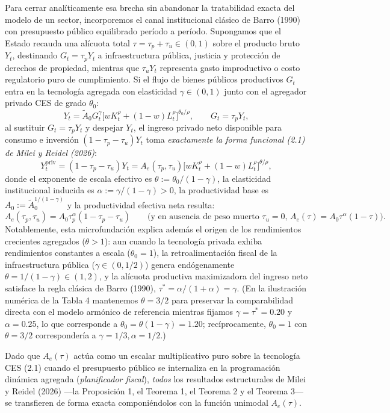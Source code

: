 \documentclass[11pt,letterpaper]{article}
\theoremstyle{plain}
\begin{document}
Para cerrar analíticamente esa brecha sin abandonar la tratabilidad exacta del modelo de un sector, incorporemos el canal institucional clásico de Barro (1990) con presupuesto público equilibrado período a período. Supongamos que el Estado recauda una alícuota total $\tau=\tau_p+\tau_u\in(0,1)$ sobre el producto bruto $Y_t$, destinando $G_t=\tau_p Y_t$ a infraestructura pública, justicia y protección de derechos de propiedad, mientras que $\tau_u Y_t$ representa gasto improductivo o costo regulatorio puro de cumplimiento. Si el flujo de bienes públicos productivos $G_t$ entra en la tecnología agregada con elasticidad $\gamma\in(0,1)$ junto con el agregador privado CES de grado $\theta_0$:
\[
Y_t = \widetilde{A}_0 G_t^\gamma \big[wK_t^\rho + (1-w)L_t^\rho\big]^{\theta_0/\rho}, \qquad G_t = \tau_p Y_t,
\]
al sustituir $G_t=\tau_p Y_t$ y despejar $Y_t$, el ingreso privado neto disponible para consumo e inversión $(1-\tau_p-\tau_u)Y_t$ toma \emph{exactamente la forma funcional (2.1) de Milei y Reidel (2026)}:
\[
Y_t^{\mathrm{priv}} = (1-\tau_p-\tau_u)Y_t = A_e(\tau_p,\tau_u)\big[wK_t^\rho + (1-w)L_t^\rho\big]^{\theta/\rho},
\]
donde el exponente de escala efectivo es $\theta:=\theta_0/(1-\gamma)$, la elasticidad institucional inducida es $\alpha:=\gamma/(1-\gamma)>0$, la productividad base es $A_0:=\widetilde{A}_0^{1/(1-\gamma)}$ y la productividad efectiva neta resulta:
\[
A_e(\tau_p,\tau_u) = A_0\tau_p^\alpha(1-\tau_p-\tau_u) \qquad \text{(y en ausencia de peso muerto $\tau_u=0$, } A_e(\tau)=A_0\tau^\alpha(1-\tau)\text{).}
\]
Notablemente, esta microfundación explica además el origen de los rendimientos crecientes agregados ($\theta>1$): aun cuando la tecnología privada exhiba rendimientos constantes a escala ($\theta_0=1$), la retroalimentación fiscal de la infraestructura pública ($\gamma\in(0,1/2)$) genera endógenamente $\theta=1/(1-\gamma)\in(1,2)$, y la alícuota productiva maximizadora del ingreso neto satisface la regla clásica de Barro (1990), $\tau^*=\alpha/(1+\alpha)=\gamma$. (En la ilustración numérica de la Tabla 4 mantenemos $\theta=3/2$ para preservar la comparabilidad directa con el modelo armónico de referencia mientras fijamos $\gamma=\tau^*=0.20$ y $\alpha=0.25$, lo que corresponde a $\theta_0=\theta(1-\gamma)=1.20$; recíprocamente, $\theta_0=1$ con $\theta=3/2$ correspondería a $\gamma=1/3, \alpha=1/2$.)

Dado que $A_e(\tau)$ actúa como un escalar multiplicativo puro sobre la tecnología CES (2.1) cuando el presupuesto público se internaliza en la programación dinámica agregada (\emph{planificador fiscal}), \emph{todos} los resultados estructurales de Milei y Reidel (2026) ---la Proposición 1, el Teorema 1, el Teorema 2 y el Teorema 3--- se transfieren de forma exacta componiéndolos con la función unimodal $A_e(\tau)$.
\end{document}
